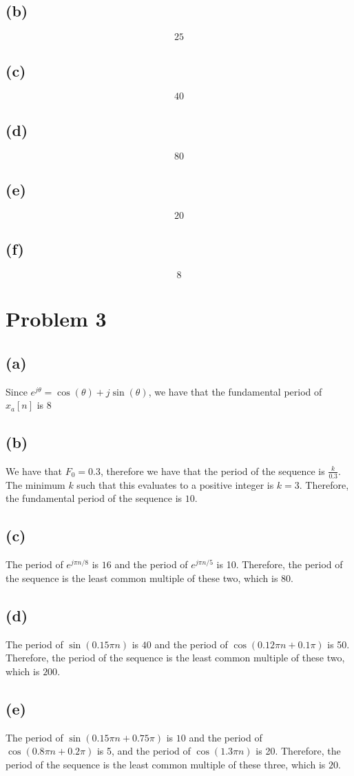 \subsection*{(b)}
$$\boxed{25}$$
\subsection*{(c)}
$$\boxed{40}$$
\subsection*{(d)}
$$\boxed{80}$$
\subsection*{(e)}
$$\boxed{20}$$
\subsection*{(f)}
$$\boxed{8}$$
\section*{Problem 3}
\subsection*{(a)}
Since $e^{j\theta} = \cos(\theta) + j\sin(\theta)$, we have
that the fundamental period of $\hat{x}_a[n]$ is $\boxed{8}$
\subsection*{(b)}
We have that $F_0=0.3$, therefore we have that the period of the sequence
is $\frac{k}{0.3}$. The minimum $k$ such that this evaluates to a
positive integer is $k=3$. Therefore, the fundamental period of
the sequence is $\boxed{10}$.
\subsection*{(c)}
The period of $e^{j\pi n /8}$ is $16$ and the period of
 $e^{j\pi n /5}$ is 10. Therefore, the period of the sequence
 is the least common multiple of these two, which is $\boxed{80}$. 
\subsection*{(d)}
The period of $\sin(0.15\pi n)$ is $40$ and the period of
 $\cos(0.12\pi n+0.1\pi)$ is 50. Therefore, the period of the sequence
 is the least common multiple of these two, which is $\boxed{200}$. 
\subsection*{(e)}
The period of $\sin(0.15\pi n+0.75\pi)$ is $10$ and the period of
 $\cos(0.8\pi n+0.2\pi)$ is 5, and the period of $\cos(1.3\pi n)$ is 20. Therefore, the period of the sequence
 is the least common multiple of these three, which is $\boxed{20}$.
